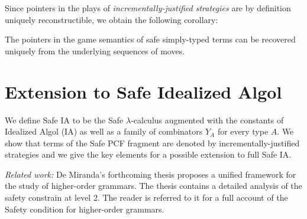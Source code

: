 \documentclass{llncs}
\begin{document}
Since pointers in the plays of \emph{incrementally-justified
strategies} are by definition uniquely reconstructible, we obtain
the following corollary:

\begin{cor}
\label{cor:safeptrrecover} The pointers in the game semantics of
safe simply-typed terms can be recovered uniquely from the
underlying sequences of moves.
\end{cor}

\section{Extension to Safe Idealized Algol}

We define Safe \textsf{IA} to be the Safe $\lambda$-calculus
augmented with the constants of Idealized Algol (\textsf{IA})
\cite{Reynolds81} as well as a family of combinators $Y_A$ for every
type $A$. We show that terms of the Safe \textsf{PCF}
\cite{DBLP:journals/tcs/Plotkin77} fragment are denoted by
incrementally-justified strategies and we give the key elements for
a possible extension to full Safe \textsf{IA}.



\vspace{1cm}

\emph{Related work:} De Miranda's forthcoming thesis \cite{demirandathesis} proposes a unified framework for the study of higher-order grammars. The thesis contains a detailed analysis of the safety constrain at level 2. The reader is referred to it for a full account of the Safety condition for higher-order grammars.




\end{document}
